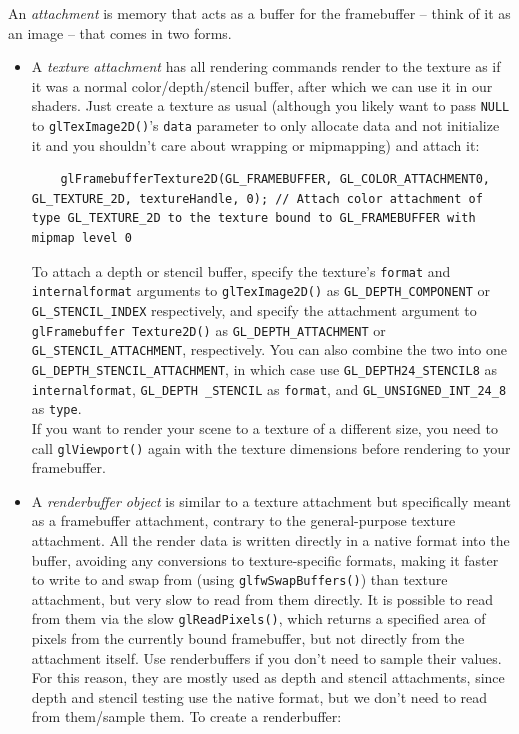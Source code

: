 \documentclass[table, xcdraw]{article}%
\begin{document}
An \emph{attachment} is memory that acts as a buffer for the framebuffer -- think of it as an image -- that comes in two forms.
\begin{itemize}
    \item A \emph{texture attachment} has all rendering commands render to the texture as if it was a normal color/depth/stencil buffer, after which we can use it in our shaders. Just create a texture as usual (although you likely want to pass \texttt{NULL} to \texttt{glTexImage2D()}'s \texttt{data} parameter to only allocate data and not initialize it and you shouldn't care about wrapping or mipmapping) and attach it:

    \begin{verbatim}
    glFramebufferTexture2D(GL_FRAMEBUFFER, GL_COLOR_ATTACHMENT0, GL_TEXTURE_2D, textureHandle, 0); // Attach color attachment of type GL_TEXTURE_2D to the texture bound to GL_FRAMEBUFFER with mipmap level 0
    \end{verbatim}
    
    To attach a depth or stencil buffer, specify the texture's \texttt{format} and \texttt{internalformat} arguments to \texttt{glTexImage2D()} as \texttt{GL_DEPTH_COMPONENT} or \texttt{GL_STENCIL_INDEX} respectively, and specify the attachment argument to \texttt{glFramebuffer Texture2D()} as \texttt{GL_DEPTH_ATTACHMENT} or \texttt{GL_STENCIL_ATTACHMENT}, respectively. You can also combine the two into one \texttt{GL_DEPTH_STENCIL_ATTACHMENT}, in which case use \texttt{GL_DEPTH24_STENCIL8} as \texttt{internalformat}, \texttt{GL_DEPTH _STENCIL} as \texttt{format}, and \texttt{GL_UNSIGNED_INT_24_8} as \texttt{type}.\\
    If you want to render your scene to a texture of a different size, you need to call \texttt{glViewport()} again with the texture dimensions before rendering to your framebuffer.
    \item A \emph{renderbuffer object} is similar to a texture attachment but specifically meant as a framebuffer attachment, contrary to the general-purpose texture attachment. All the render data is written directly in a native format into the buffer, avoiding any conversions to texture-specific formats, making it faster to write to and swap from (using \texttt{glfwSwapBuffers()}) than texture attachment, but very slow to read from them directly. It is possible to read from them via the slow \texttt{glReadPixels()}, which returns a specified area of pixels from the currently bound framebuffer, but not directly from the attachment itself. Use renderbuffers if you don't need to sample their values. For this reason, they are mostly used as depth and stencil attachments, since depth and stencil testing use the native format, but we don't need to read from them/sample them. To create a renderbuffer:
    

\end{itemize}
\end{document}

